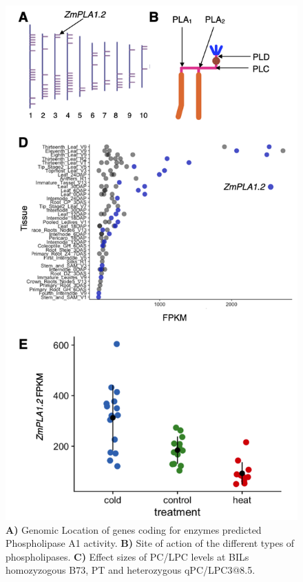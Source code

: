 \documentclass[9pt,twocolumn,twoside,lineno]{BioRxiv}
\begin{document}
\begin{figure}[t]
\begin{center}
\includegraphics[width=0.4\paperwidth]{Sup_Figures/Sup_Fig_3.png}
\caption{\textbf{A)} Genomic Location of genes coding for enzymes predicted Phospholipase A1 activity. 
\textbf{B)} Site of action of the different types of phospholipases.
\textbf{C)} Effect sizes of PC/LPC levels at BILs homozyzogous B73, PT and heterozygous qPC/LPC3@8.5.
} 
\label{SupFig3}
\end{center}
\end{figure}  
\end{document}
